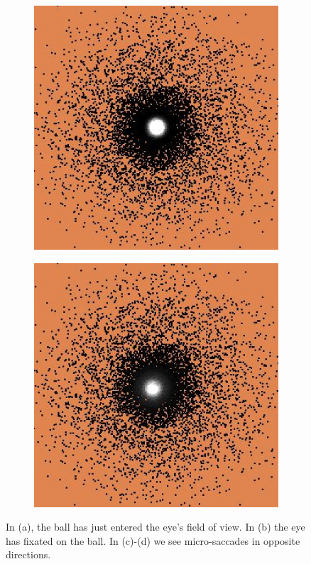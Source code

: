 \documentclass[../taasin.tex]{subfiles}
\begin{document}
\begin{figure}
\begin{subfigure}[b]{0.20\textwidth}
        \caption{}
    \end{subfigure}
    \hfill
    \centering
    \begin{subfigure}[b]{0.20\textwidth}
        \centering
        \includegraphics[width=\textwidth]{figures/fixation3.pdf}
        \caption{}
    \end{subfigure}
    \hfill
    \centering
    \begin{subfigure}[b]{0.20\textwidth}
        \centering
        \includegraphics[width=\textwidth]{figures/fixation4.pdf}
        \caption{}
    \end{subfigure}
    \caption{In (a), the ball has just entered the eye's field of view. In (b) the eye has fixated on the ball. In (c)-(d) we see micro-saccades in opposite directions.}
    \label{fig:fixation}
\end{figure}
\end{document}
